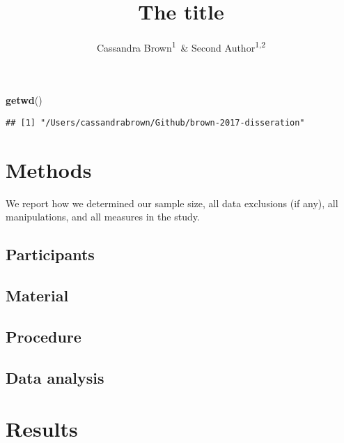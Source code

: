 \documentclass[english,man]{apa6}
\title{The title}
\author{Cassandra Brown\textsuperscript{1}~\& Second Author\textsuperscript{1,2}}
\affiliation{
    \vspace{0.5cm}
          \textsuperscript{1} University of Victoria\\
          \textsuperscript{2}   }
\newenvironment{Shaded}{\begin{snugshade}}{\end{snugshade}}
\newcommand{\KeywordTok}[1]{\textcolor[rgb]{0.13,0.29,0.53}{\textbf{{#1}}}}
\newcommand{\NormalTok}[1]{{#1}}
\theoremstyle{definition}
\theoremstyle{definition}
\theoremstyle{remark}
\begin{document}
\maketitle

\setcounter{secnumdepth}{0}



\begin{Shaded}
\begin{Highlighting}[]
\KeywordTok{getwd}\NormalTok{()}
\end{Highlighting}
\end{Shaded}

\begin{verbatim}
## [1] "/Users/cassandrabrown/Github/brown-2017-disseration"
\end{verbatim}

\section{Methods}\label{methods}

We report how we determined our sample size, all data exclusions (if
any), all manipulations, and all measures in the study.

\subsection{Participants}\label{participants}

\subsection{Material}\label{material}

\subsection{Procedure}\label{procedure}

\subsection{Data analysis}\label{data-analysis}

\section{Results}\label{results}
\end{document}
